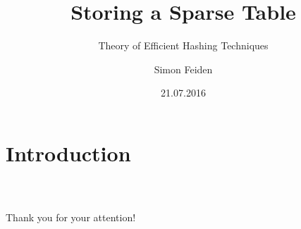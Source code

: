 \documentclass{beamer}
\title{Storing a Sparse Table}
\subtitle{Theory of Efficient Hashing Techniques}
\date{21.07.2016}
\author{Simon Feiden}
\begin{document}
	
	
\maketitle



\section{Introduction}



\begin{frame}
	\frametitle{\ }
	\begin{center}
		\LARGE Thank you for your attention!
	\end{center}
\end{frame}


\begin{frame}
\end{frame}







\end{document}
